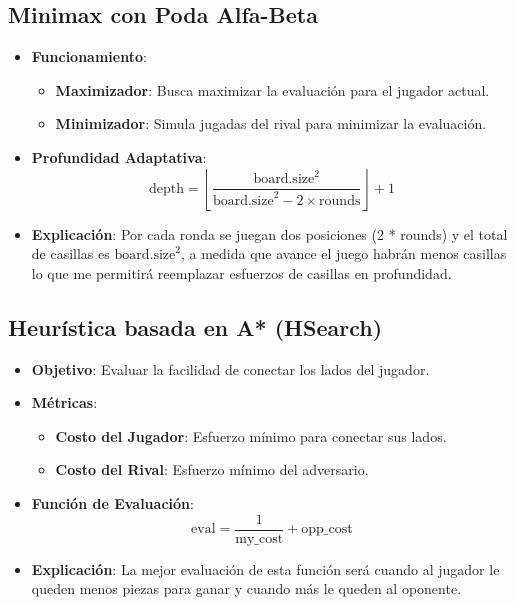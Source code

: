 \documentclass{article}
\begin{document}
\subsection{Minimax con Poda Alfa-Beta}
\begin{itemize}
\item \textbf{Funcionamiento}:
\begin{itemize}
\item \textbf{Maximizador}: Busca maximizar la evaluación para el jugador actual.
\item \textbf{Minimizador}: Simula jugadas del rival para minimizar la evaluación.
\end{itemize}
\item \textbf{Profundidad Adaptativa}:
\[ \text{depth} = \left\lfloor \frac{\text{board.size}^2}{\text{board.size}^2 - 2 \times \text{rounds}} \right\rfloor + 1 \]
\item \textbf{Explicación}: Por cada ronda se juegan dos posiciones (2 * rounds) y el total de casillas es $\text{board.size}^2$,
    a medida que avance el juego habrán menos casillas lo que me permitirá reemplazar esfuerzos de casillas en profundidad.
\end{itemize}

\subsection{Heurística basada en A* (HSearch)}
\begin{itemize}
\item \textbf{Objetivo}: Evaluar la facilidad de conectar los lados del jugador.
\item \textbf{Métricas}:
\begin{itemize}
\item \textbf{Costo del Jugador}: Esfuerzo mínimo para conectar sus lados.
\item \textbf{Costo del Rival}: Esfuerzo mínimo del adversario.
\end{itemize}
\item \textbf{Función de Evaluación}:
\[ \text{eval} = \frac{1}{\text{my\_cost}} + \text{opp\_cost} \]
\item \textbf{Explicación}: La mejor evaluación de esta función será cuando al jugador le queden menos piezas para ganar y 
    cuando más le queden al oponente.
\end{itemize}
\end{document}
